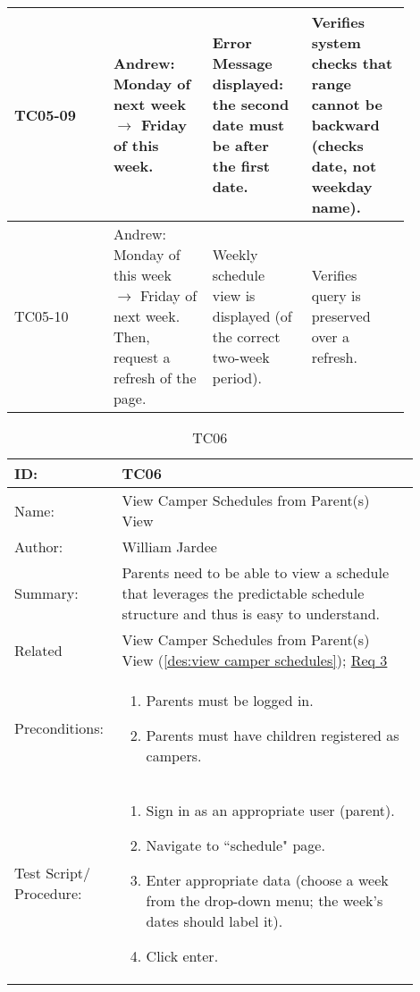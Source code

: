 \documentclass[11pt]{article}
\begin{document}
\begin{center}
\begin{longtable}{|p{0.22\linewidth}|p{0.22\linewidth}|p{0.22\linewidth}|p{0.22\linewidth}|}
	TC05-09 & Andrew: Monday of next week $\longrightarrow$ Friday of this week. & Error Message displayed: the second date must be after the first date. & Verifies system checks that range cannot be backward (checks date, not weekday name).\vspace*{1em}\\\hline
	TC05-10 & Andrew: Monday of this week $\longrightarrow$ Friday of next week. Then, request a refresh of the page. & Weekly schedule view is displayed (of the correct two-week period). & Verifies query is preserved over a refresh.\vspace*{1em}\\\hline
\end{longtable}
\end{center}
\clearpage


\begin{table}[H]
\begin{center}
\caption{TC06}
\label{TC06}
\begin{tabular}{p{0.20\linewidth}p{0.70\linewidth}}
	ID: & TC06\\\hline
	Name: & View Camper Schedules from Parent(s) View \\\hline
	Author: & William Jardee\\\hline
	Summary: & Parents need to be able to view a schedule that leverages the predictable schedule structure and thus is easy to understand. \\\hline
	Related \hspace{5em} & View Camper Schedules from Parent(s) View (\cref{des:view camper schedules}); \hyperlink{Req3}{Req 3}\\\hline
	Preconditions:& \begin{enumerate}[topsep=0pt] 
		\item Parents must be logged in.
		\item Parents must have children registered as campers.
	\end{enumerate}\\\hline
	Test Script/ Procedure: & \begin{enumerate}[topsep=0pt]
		\item Sign in as an appropriate user (parent).
		\item Navigate to ``schedule" page.
		\item Enter appropriate data (choose a week from the drop-down menu; the week's dates should label it).
		\item Click enter.
	\end{enumerate}\\\hline

\end{tabular}
\end{center}
\end{table}
\end{document}
